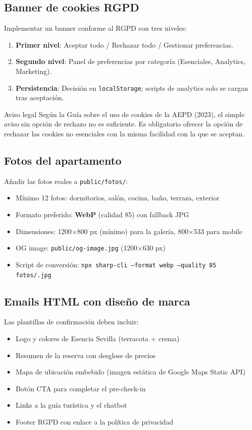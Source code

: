 \documentclass[12pt,a4paper,twoside,openright]{report}
\begin{document}
\subsection{Banner de cookies RGPD}

Implementar un banner conforme al RGPD con tres niveles:
\begin{enumerate}
  \item \textbf{Primer nivel}: Aceptar todo / Rechazar todo / Gestionar preferencias.
  \item \textbf{Segundo nivel}: Panel de preferencias por categoría
        (Esenciales, Analytics, Marketing).
  \item \textbf{Persistencia}: Decisión en \texttt{localStorage}; scripts de
        analytics solo se cargan tras aceptación.
\end{enumerate}

\begin{warnbox}{Aviso legal}
Según la Guía sobre el uso de cookies de la AEPD (2023), el simple aviso sin
opción de rechazo no es suficiente. Es obligatorio ofrecer la opción de rechazar
las cookies no esenciales con la misma facilidad con la que se aceptan.
\end{warnbox}

\subsection{Fotos del apartamento}

Añadir las fotos reales a \texttt{public/fotos/}:
\begin{itemize}
  \item Mínimo 12 fotos: dormitorios, salón, cocina, baño, terraza, exterior
  \item Formato preferido: \textbf{WebP} (calidad 85) con fallback JPG
  \item Dimensiones: 1200×800 px (mínimo) para la galería, 800×533 para mobile
  \item OG image: \texttt{public/og-image.jpg} (1200×630 px)
  \item Script de conversión: \texttt{npx sharp-cli --format webp --quality 85 fotos/\*.jpg}
\end{itemize}

\subsection{Emails HTML con diseño de marca}

Las plantillas de confirmación deben incluir:
\begin{itemize}
  \item Logo y colores de Esencia Sevilla (terracota + crema)
  \item Resumen de la reserva con desglose de precios
  \item Mapa de ubicación embebido (imagen estática de Google Maps Static API)
  \item Botón CTA para completar el pre-check-in
  \item Links a la guía turística y el chatbot
  \item Footer RGPD con enlace a la política de privacidad
\end{itemize}
\end{document}
